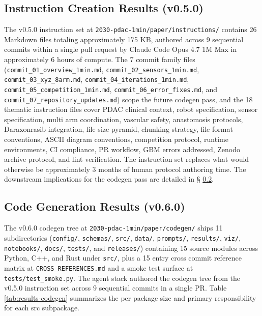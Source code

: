 
\subsection{Instruction Creation Results (v0.5.0)}
\label{sec:results-instructions}

The v0.5.0 instruction set at
\texttt{2030-pdac-1min/paper/instructions/} contains 26 Markdown
files totaling approximately 175 KB, authored across 9 sequential
commits within a single pull request by Claude Code Opus 4.7 1M
Max in approximately 6 hours of compute. The 7 commit family files
(\texttt{commit_01_overview_1min.md},
\texttt{commit_02_sensors_1min.md},
\texttt{commit_03_xyz_8arm.md},
\texttt{commit_04_iterations_1min.md},
\texttt{commit_05_competition_1min.md},
\texttt{commit_06_error_fixes.md}, and
\texttt{commit_07_repository_updates.md}) scope the future codegen
pass, and the 18 thematic instruction files cover PDAC clinical
context, robot specification, sensor specification, multi arm
coordination, vascular safety, anastomosis protocols, Daraxonrasib
integration, file size pyramid, chunking strategy, file format
conventions, ASCII diagram conventions, competition protocol,
runtime environments, CI compliance, PR workflow, GBM errors
addressed, Zenodo archive protocol, and lint verification. The
instruction set replaces what would otherwise be approximately 3
months of human protocol authoring time. The downstream
implications for the codegen pass are detailed in \S
\ref{sec:results-codegen}.

\subsection{Code Generation Results (v0.6.0)}
\label{sec:results-codegen}

The v0.6.0 codegen tree at \texttt{2030-pdac-1min/paper/codegen/}
ships 11 subdirectories (\texttt{config/}, \texttt{schemas/},
\texttt{src/}, \texttt{data/}, \texttt{prompts/}, \texttt{results/},
\texttt{viz/}, \texttt{notebooks/}, \texttt{docs/},
\texttt{tests/}, and \texttt{releases/}) containing 15 source
modules across Python, C++, and Rust under \texttt{src/}, plus a
15 entry cross commit reference matrix at
\texttt{CROSS_REFERENCES.md} and a smoke test surface at
\texttt{tests/test_smoke.py}. The agent stack \cite{claude-code,
claude-opus-47} authored the codegen tree from the v0.5.0
instruction set across 9 sequential commits in a single PR. Table
\ref{tab:results-codegen} summarizes the per package size and
primary responsibility for each src subpackage.

